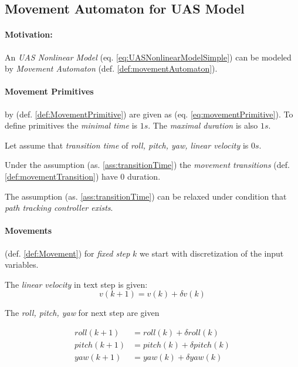 \subsection{Movement Automaton for UAS Model}\label{s:movementAutomatonDefinition}

\paragraph{Motivation:} An \emph{UAS Nonlinear Model} (eq. \ref{eq:UASNonlinearModelSimple}) can be modeled by \emph{Movement Automaton} (def. \ref{def:movementAutomaton}). 

\paragraph{Movement Primitives} by (def. \ref{def:MovementPrimitive})  are given as (eq. \ref{eq:movementPrimitive}). To define primitives the \emph{minimal time} is $1 s$. The \emph{maximal duration} is also $1s$. 

\begin{assumption}\label{ass:transitionTime}
    Let assume that \emph{transition time} of \emph{roll, pitch, yaw, linear velocity} is $0 s$.
\end{assumption}

Under the assumption (as. \ref{ass:transitionTime}) the \emph{movement transitions} (def. \ref{def:movementTransition}) have $0$ duration.

\begin{note}
    The assumption (as. \ref{ass:transitionTime}) can be relaxed under condition that \emph{path tracking controller exists}.
\end{note}

\paragraph{Movements} (def. \ref{def:Movement}) for \emph{fixed step} $k$ we start with discretization of the input variables.

\noindent The \emph{linear velocity} in text step is given:
\begin{equation}\label{eq:applyMovement}
    v(k+1) = v(k) +\delta v(k)
\end{equation}

\noindent The \emph{roll, pitch, yaw} for next step are given 

\begin{equation}\label{eq:applyMovement1}
    \begin{aligned}
        roll(k+1)  &= roll(k) + \delta roll(k)\\
        pitch(k+1) & = pitch(k) + \delta pitch(k)\\
        yaw(k+1) & = yaw(k) + \delta yaw(k)\\
    \end{aligned}    
\end{equation}

